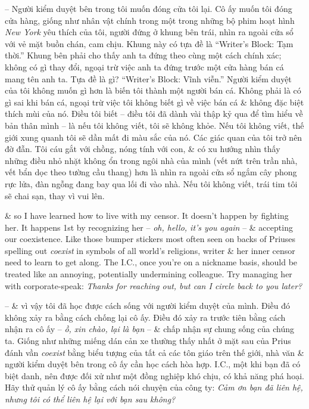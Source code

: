 \documentclass{article}
\begin{document}
\begin{itemize}
	-- 	Người kiểm duyệt bên trong tôi muốn đóng cửa tôi lại. Cô ấy muốn tôi đóng cửa hàng, giống như nhân vật chính trong một trong những bộ phim hoạt hình {\it New York} yêu thích của tôi, người đứng ở khung bên trái, nhìn ra ngoài cửa sổ với vẻ mặt buồn chán, cam chịu. Khung này có tựa đề là ``Writer's Block: Tạm thời.'' Khung bên phải cho thấy anh ta đứng theo cùng một cách chính xác; không có gì thay đổi, ngoại trừ việc anh ta đứng trước một cửa hàng bán cá mang tên anh ta. Tựa đề là gì? ``Writer's Block: Vĩnh viễn.'' Người kiểm duyệt của tôi không muốn gì hơn là biến tôi thành một người bán cá. Không phải là có gì sai khi bán cá, ngoại trừ việc tôi không biết gì về việc bán cá \& không đặc biệt thích mùi của nó. Điều tôi biết -- điều tôi đã dành vài thập kỷ qua để tìm hiểu về bản thân mình -- là nếu tôi không viết, tôi sẽ không khỏe. Nếu tôi không viết, thế giới xung quanh tôi sẽ dần mất đi màu sắc của nó. Các giác quan của tôi trở nên đờ đẫn. Tôi cáu gắt với chồng, nóng tính với con, \& có xu hướng nhìn thấy những điều nhỏ nhặt không ổn trong ngôi nhà của mình (vết nứt trên trần nhà, vết bẩn dọc theo tường cầu thang) hơn là nhìn ra ngoài cửa sổ ngắm cây phong rực lửa, đàn ngỗng đang bay qua lối đi vào nhà. Nếu tôi không viết, trái tim tôi sẽ chai sạn, thay vì vui lên.
	
	\& so I have learned how to live with my censor. It doesn't happen by fighting her. It happens 1st by recognizing her -- {\it oh, hello, it's you again} -- \& accepting our coexistence. Like those bumper stickers most often seen on backs of Priuses spelling out {\it coexist} in symbols of all world's religions, writer \& her inner censor need to learn to get along. The I.C., once you're on a nickname basis, should be treated like an annoying, potentially undermining colleague. Try managing her with corporate-speak: {\it Thanks for reaching out, but can I circle back to you later?}
	
	-- \& vì vậy tôi đã học được cách sống với người kiểm duyệt của mình. Điều đó không xảy ra bằng cách chống lại cô ấy. Điều đó xảy ra trước tiên bằng cách nhận ra cô ấy -- {\it ồ, xin chào, lại là bạn} -- \& chấp nhận sự chung sống của chúng ta. Giống như những miếng dán cản xe thường thấy nhất ở mặt sau của Prius đánh vần {\it coexist} bằng biểu tượng của tất cả các tôn giáo trên thế giới, nhà văn \& người kiểm duyệt bên trong cô ấy cần học cách hòa hợp. I.C., một khi bạn đã có biệt danh, nên được đối xử như một đồng nghiệp khó chịu, có khả năng phá hoại. Hãy thử quản lý cô ấy bằng cách nói chuyện của công ty: {\it Cảm ơn bạn đã liên hệ, nhưng tôi có thể liên hệ lại với bạn sau không?}
	

\end{itemize}
\end{document}
